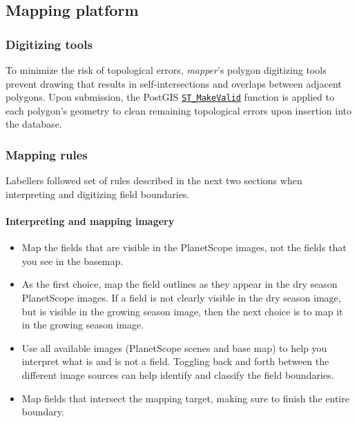 \documentclass[
  11pt,
  a4paper]{article}
\begin{document}
\hypertarget{mapping-platform}{%
\subsection{Mapping platform}\label{mapping-platform}}

\hypertarget{digitizing-tools}{%
\subsubsection{Digitizing tools}\label{digitizing-tools}}

To minimize the risk of topological errors, \emph{mapper}'s polygon
digitizing tools prevent drawing that results in self-intersections and
overlaps between adjacent polygons. Upon submission, the PostGIS
\href{https://www.postgis.net/docs/ST_MakeValid.html}{\texttt{ST\_MakeValid}}
function is applied to each polygon's geometry to clean remaining
topological errors upon insertion into the database.

\hypertarget{mapping-rules}{%
\subsubsection{Mapping rules}\label{mapping-rules}}

Labellers followed set of rules described in the next two sections when
interpreting and digitizing field boundaries.

\hypertarget{interpreting-and-mapping-imagery}{%
\paragraph{Interpreting and mapping
imagery}\label{interpreting-and-mapping-imagery}}

\begin{itemize}
\item
  Map the fields that are visible in the PlanetScope images, not the
  fields that you see in the basemap.
\item
  As the first choice, map the field outlines as they appear in the dry
  season PlanetScope images. If a field is not clearly visible in the
  dry season image, but is visible in the growing season image, then the
  next choice is to map it in the growing season image.
\item
  Use all available images (PlanetScope scenes and base map) to help you
  interpret what is and is not a field. Toggling back and forth between
  the different image sources can help identify and classify the field
  boundaries.
\item
  Map fields that intersect the mapping target, making sure to finish
  the entire boundary.
\end{itemize}
\end{document}
